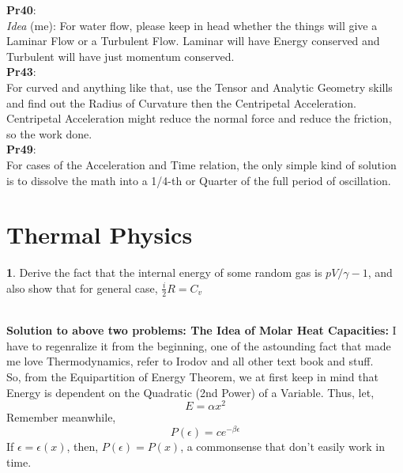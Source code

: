 \documentclass[a4paper]{article}
\theoremstyle{definition}
\newtheorem{prob}{ \framebox[0.09\textwidth]{{\sffamily Pr}} }
\newcommand{\pr}[1]{ \begin{tcolorbox} \begin{prob} 
    #1 
\end{prob} 
   \end{tcolorbox}\ 
   \\
 }
\begin{document}
\textsf{\textbf{Pr40}}:\\
\emph{Idea} (me): For water flow, please keep in head whether the things will give a Laminar Flow or a Turbulent Flow. 
Laminar will have Energy conserved and Turbulent will have just momentum conserved. \\
\textsf{\textbf{Pr43}}:\\
For curved and anything like that, use the Tensor and Analytic Geometry skills and find out the Radius of Curvature then the Centripetal Acceleration. Centripetal Acceleration might reduce the normal force and reduce the friction, so the work done.\\
\textsf{\textbf{Pr49}}:\\
For cases of the Acceleration and Time relation, the only simple kind of solution is to dissolve the math into a 1/4-th or Quarter of the full period of oscillation.  




\section{\textsf{Thermal Physics}}
\pr{Derive the fact that the internal energy of some random gas is $ pV/ \gamma - 1 $, and
also show that for general case, $\frac{i}{2} R = C_v$} 
\textbf{Solution to above two problems: The Idea of Molar Heat Capacities:} I have to regenralize it from the beginning, one of the astounding fact that made me love Thermodynamics, refer to Irodov and all other text book and stuff. \\
So, from the Equipartition of Energy Theorem, we at first keep in mind that Energy is dependent on the Quadratic (2nd Power) of a Variable. Thus, let, 
\[ E = \alpha x^2 \]
Remember meanwhile, 
\begin{equation}
P(\epsilon) = c e^{-\beta \epsilon} 
\end{equation}
If $\epsilon = \epsilon(x)$, then, $P(\epsilon) = P(x)$, a commonsense that don't easily work in time. 
\end{document}
